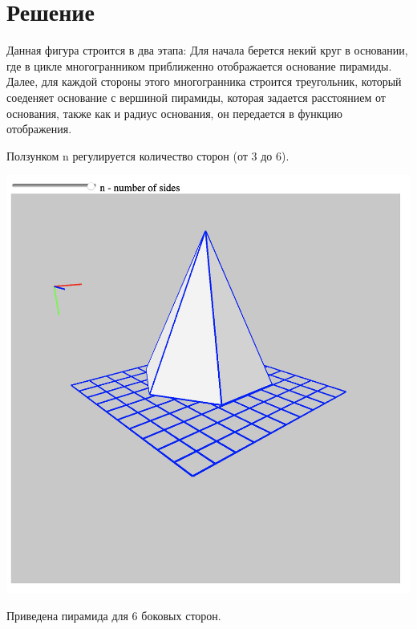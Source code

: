 \section{Решение}

Данная фигура строится в два этапа: Для начала берется некий круг в основании, где в цикле многогранником приближенно отображается основание пирамиды. Далее, для каждой стороны этого многогранника строится треугольник, который соеденяет основание с вершиной пирамиды, которая задается расстоянием от основания, также как и радиус основания, он передается в функцию отображения.





Ползунком n регулируется количество сторон (от 3 до 6).


\includegraphics[scale=0.5]{pictures/3.png}

Приведена пирамида для 6 боковых сторон.

